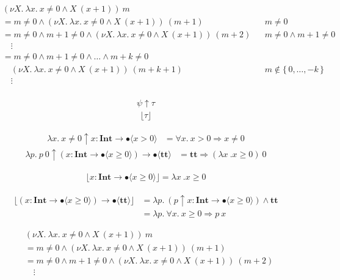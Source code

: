 \documentclass{jarticle}
\theoremstyle{definition}
\newcommand \goal {\psi}
\newcommand \true {\textbf{tt}}
\newcommand \stypeint {\textbf{Int}}
\newcommand \stypebool {\bullet}
\newcommand \refty {\tau}
\newcommand \typeint[1]{{#1} : \stypeint}
\newcommand \typebool[1]{\stypebool \langle #1 \rangle}
\newcommand \ti[1]{\typeint{#1}}
\newcommand \tb[1]{\typebool{#1}}
\newcommand {\floor}[1] {\lfloor #1 \rfloor }
\newcommand {\pdrtypes} {\uparrow}
\begin{document}
\begin{align*}
  &(\nu X.\: \lambda x.\: x \neq 0 \wedge X\ (x + 1))\ m &&\\
  &= m \neq 0 \wedge (\nu X.\: \lambda x.\: x \neq 0 \wedge X\ (x + 1))\ (m + 1)
    &&m \neq 0 \\
  &= m \neq 0 \wedge m +1 \neq 0 \wedge (\nu X.\: \lambda x.\: x \neq 0 \wedge
          X\ (x + 1))\ (m + 2)  && m \neq 0 \wedge m + 1 \neq 0 \\
  &\quad \vdots &&\\
  &= m \neq 0 \wedge m +1 \neq 0 \wedge \dots \wedge m + k \neq 0 &&  \\
  &\quad (\nu X.\: \lambda x.\: x \neq 0 \wedge X\ (x + 1))\ (m + k + 1) &&
  m \not \in \{\, 0, \dots, -k \,\} \\
  &\quad \vdots &&\\
\end{align*}

\begin{align*}
    \goal \pdrtypes \refty
\end{align*}
\begin{align*}
    \floor{\refty}
\end{align*}

\begin{align*}
    \lambda x.\: x \neq 0 \pdrtypes \ti{x} \to \tb{x > 0}
    &= \forall x.\: x > 0 \Rightarrow x \neq 0
\end{align*}
\begin{align*}
    \lambda p.\: p\ 0 \pdrtypes (\ti{x} \to \tb{x \geq 0}) \to \tb{\true}
    &= \true \Rightarrow (\lambda x\:. x \geq 0)\ 0
\end{align*}

\begin{align*}
    \floor{\ti{x} \to \tb{x \geq 0}} = \lambda x\:. x \geq 0
\end{align*}

\begin{align*}
    \floor{(\ti{x} \to \tb{x \geq 0}) \to \tb{\true}}
        &= \lambda p.\: (p \pdrtypes \ti{x} \to \tb{x \geq 0}) \wedge \true \\
        &= \lambda p.\: \forall x.\: x \geq 0 \Rightarrow p\ x
\end{align*}

\begin{align*}
  &(\nu X.\: \lambda x.\: x \neq 0 \wedge X\ (x + 1))\ m \\
  &= m \neq 0 \wedge (\nu X.\: \lambda x.\: x \neq 0 \wedge X\ (x + 1))\ (m + 1)
    \\
  &= m \neq 0 \wedge m +1 \neq 0 \wedge (\nu X.\: \lambda x.\: x \neq 0 \wedge
          X\ (x + 1))\ (m + 2) \\
  &\quad \vdots \\
\end{align*}
\end{document}
